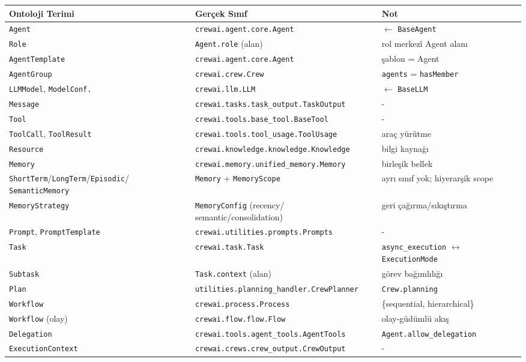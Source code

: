 \documentclass[10pt, a4paper, twocolumn]{article}
\begin{document}
\begin{center}
\tiny
\setlength{\tabcolsep}{3pt}
\begin{tabular}{|p{1.4cm}|p{3.4cm}|p{2.2cm}|}
\hline
\textbf{Ontoloji Terimi} & \textbf{Gerçek Sınıf} & \textbf{Not} \\
\hline
\texttt{Agent} & \texttt{crewai.agent.core.Agent} & $\leftarrow$ \texttt{BaseAgent} \\
\hline
\texttt{Role} & \texttt{Agent.role} (alan) & rol merkezî Agent alanı \\
\hline
\texttt{AgentTemplate} & \texttt{crewai.agent.core.Agent} & şablon = Agent \\
\hline
\texttt{AgentGroup} & \texttt{crewai.crew.Crew} & \texttt{agents} = \texttt{hasMember} \\
\hline
\texttt{LLMModel}, \texttt{ModelConf.} & \texttt{crewai.llm.LLM} & $\leftarrow$ \texttt{BaseLLM} \\
\hline
\texttt{Message} & \texttt{crewai.tasks.task\_output.\-TaskOutput} & {-} \\
\hline
\texttt{Tool} & \texttt{crewai.tools.base\_tool.BaseTool} & {-} \\
\hline
\texttt{ToolCall}, \texttt{ToolResult} & \texttt{crewai.tools.tool\_usage.\-ToolUsage} & araç yürütme \\
\hline
\texttt{Resource} & \texttt{crewai.knowledge.\-knowledge.Knowledge} & bilgi kaynağı \\
\hline
\texttt{Memory} & \texttt{crewai.memory.unified\_\-memory.Memory} & birleşik bellek \\
\hline
\texttt{ShortTerm}/\texttt{Long\-Term}/\texttt{Episodic}/ \texttt{SemanticMemory} & \texttt{Memory} + \texttt{MemoryScope} & ayrı sınıf yok; hiyerarşik scope \\
\hline
\texttt{MemoryStrategy} & \texttt{MemoryConfig} (recency/ semantic/consolidation) & geri çağırma/sıkıştırma \\
\hline
\texttt{Prompt}, \texttt{PromptTemplate} & \texttt{crewai.utilities.prompts.\-Prompts} & {-} \\
\hline
\texttt{Task} & \texttt{crewai.task.Task} & \texttt{async\_execution} $\leftrightarrow$ \texttt{ExecutionMode} \\
\hline
\texttt{Subtask} & \texttt{Task.context} (alan) & görev bağımlılığı \\
\hline
\texttt{Plan} & \texttt{utilities.planning\_handler.\-CrewPlanner} & \texttt{Crew.planning} \\
\hline
\texttt{Workflow} & \texttt{crewai.process.Process} & \{sequential, hierarchical\} \\
\hline
\texttt{Workflow} (olay) & \texttt{crewai.flow.flow.Flow} & olay-güdümlü akış \\
\hline
\texttt{Delegation} & \texttt{crewai.tools.agent\_tools.\-AgentTools} & \texttt{Agent.allow\_delegation} \\
\hline
\texttt{ExecutionContext} & \texttt{crewai.crews.crew\_output.\-CrewOutput} & {-} \\
\hline
\end{tabular}
\label{tab:map-crewai}
\end{center}
\end{document}
